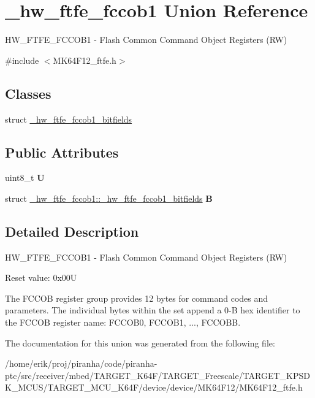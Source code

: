 \hypertarget{union__hw__ftfe__fccob1}{}\section{\+\_\+hw\+\_\+ftfe\+\_\+fccob1 Union Reference}
\label{union__hw__ftfe__fccob1}


H\+W\+\_\+\+F\+T\+F\+E\+\_\+\+F\+C\+C\+O\+B1 -\/ Flash Common Command Object Registers (RW)  




{\ttfamily \#include $<$M\+K64\+F12\+\_\+ftfe.\+h$>$}

\subsection*{Classes}
\begin{DoxyCompactItemize}
\item 
struct \hyperlink{struct__hw__ftfe__fccob1_1_1__hw__ftfe__fccob1__bitfields}{\+\_\+hw\+\_\+ftfe\+\_\+fccob1\+\_\+bitfields}
\end{DoxyCompactItemize}
\subsection*{Public Attributes}
\begin{DoxyCompactItemize}
\item 
uint8\+\_\+t {\bfseries U}\hypertarget{union__hw__ftfe__fccob1_ae81cf342277e29d883e3600e2a9efa84}{}\label{union__hw__ftfe__fccob1_ae81cf342277e29d883e3600e2a9efa84}

\item 
struct \hyperlink{struct__hw__ftfe__fccob1_1_1__hw__ftfe__fccob1__bitfields}{\+\_\+hw\+\_\+ftfe\+\_\+fccob1\+::\+\_\+hw\+\_\+ftfe\+\_\+fccob1\+\_\+bitfields} {\bfseries B}\hypertarget{union__hw__ftfe__fccob1_ac3c5f0e59cf6838046e7751365de4a0b}{}\label{union__hw__ftfe__fccob1_ac3c5f0e59cf6838046e7751365de4a0b}

\end{DoxyCompactItemize}


\subsection{Detailed Description}
H\+W\+\_\+\+F\+T\+F\+E\+\_\+\+F\+C\+C\+O\+B1 -\/ Flash Common Command Object Registers (RW) 

Reset value\+: 0x00U

The F\+C\+C\+OB register group provides 12 bytes for command codes and parameters. The individual bytes within the set append a 0-\/B hex identifier to the F\+C\+C\+OB register name\+: F\+C\+C\+O\+B0, F\+C\+C\+O\+B1, ..., F\+C\+C\+O\+BB. 

The documentation for this union was generated from the following file\+:\begin{DoxyCompactItemize}
\item 
/home/erik/proj/piranha/code/piranha-\/ptc/src/receiver/mbed/\+T\+A\+R\+G\+E\+T\+\_\+\+K64\+F/\+T\+A\+R\+G\+E\+T\+\_\+\+Freescale/\+T\+A\+R\+G\+E\+T\+\_\+\+K\+P\+S\+D\+K\+\_\+\+M\+C\+U\+S/\+T\+A\+R\+G\+E\+T\+\_\+\+M\+C\+U\+\_\+\+K64\+F/device/device/\+M\+K64\+F12/M\+K64\+F12\+\_\+ftfe.\+h\end{DoxyCompactItemize}
